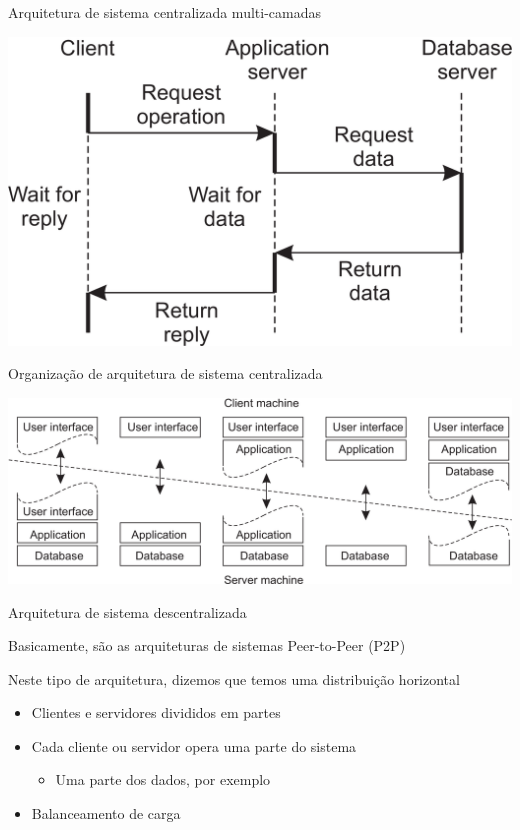 \documentclass[compress]{beamer}
\begin{document}

\begin{frame}{Arquitetura de sistema centralizada multi-camadas}

\vspace{1cm}
 
\centering\includegraphics[width=0.75\linewidth]{images/client-server-multi.png}

\end{frame}


\begin{frame}{Organização de arquitetura de sistema centralizada}

\vspace{1cm}

\centering\includegraphics[width=\linewidth]{images/client-server-different.png}

\end{frame}


\begin{frame}{Arquitetura de sistema descentralizada}

Basicamente, são as arquiteturas de sistemas Peer-to-Peer (P2P)

Neste tipo de arquitetura, dizemos que temos uma distribuição horizontal
\begin{itemize}
    \item Clientes e servidores divididos em partes
    \item Cada cliente ou servidor opera uma parte do sistema
    \begin{itemize}
        \item Uma parte dos dados, por exemplo
    \end{itemize}
    \item Balanceamento de carga
\end{itemize}
\end{frame}
\end{document}
